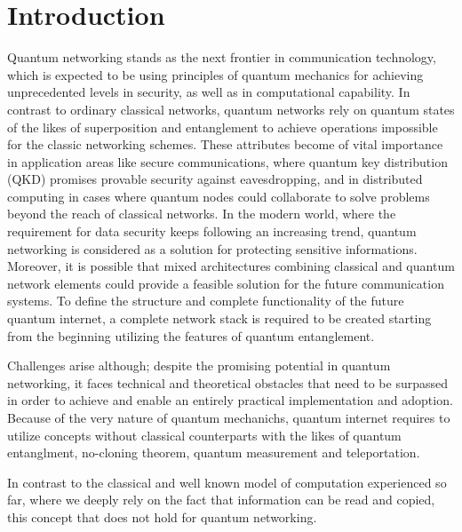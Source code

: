 \documentclass[12pt]{ieeetj}
\begin{document}
        \section{Introduction}

		Quantum networking stands as the next frontier in communication technology,
		which is expected to be using principles of quantum mechanics for
		achieving unprecedented levels in security, as well as in computational capability.
		In contrast to ordinary classical networks, quantum networks rely on quantum states
		of the likes of superposition and entanglement to achieve operations impossible for
	        the classic networking schemes. These attributes become of vital importance in 
		application areas like secure communications, where quantum key distribution (QKD) 
		promises provable security against eavesdropping, and in distributed computing in cases 
		where quantum nodes could collaborate to solve problems beyond the reach of classical networks.
		In the modern world, where the requirement for data security keeps following
		an increasing trend, quantum networking is considered as a  solution
		for protecting sensitive informations.
		Moreover, it is possible that mixed architectures combining classical and quantum network elements
		could provide a feasible solution for the future communication systems. 
		To define the structure and complete functionality of the future quantum internet,
		a complete network stack is required to be created starting from the beginning utilizing 
		the features of quantum entanglement\cite{rfc}.

		Challenges arise although; despite the promising potential in quantum networking,
		it faces technical and theoretical obstacles that need to be surpassed
		in order to achieve and enable an entirely practical implementation and adoption.
		Because of the very nature of quantum mechanichs, quantum internet requires to utilize concepts
		without classical counterparts with the likes of quantum entanglment,
		no-cloning theorem, quantum measurement and teleportation.
		
		In contrast to the classical and well known model of computation experienced so far,
		where we deeply rely on the fact that information can be read and copied, this concept that does not hold
		for quantum networking. 
		
\end{document}
